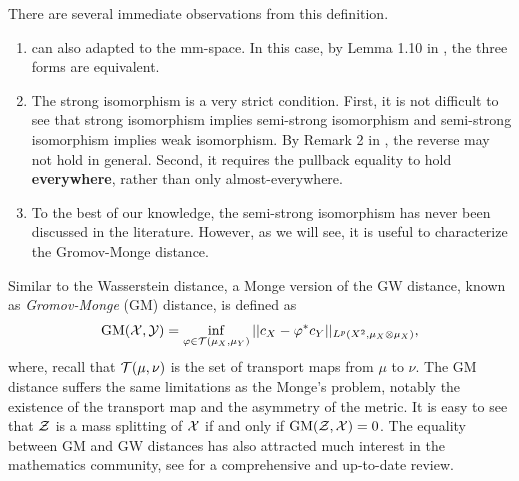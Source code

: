 There are several immediate observations from this definition.
\begin{enumerate}
  \item {} can also adapted to the mm-space. In this case,
  by Lemma 1.10 in \citep{Sturm12}, the three forms are equivalent.

  \item The strong isomorphism is a very strict condition. First,
  it is not difficult to see that strong isomorphism implies semi-strong isomorphism and
  semi-strong isomorphism implies weak isomorphism. By Remark 2 in \citep{Chowdhury19},
  the reverse may not hold in general. Second, it requires the pullback equality to hold
  \textbf{everywhere}, rather than only almost-everywhere.

  \item To the best of our knowledge, the semi-strong isomorphism has never been discussed in the literature.
  However, as we will see, it is useful to characterize the Gromov-Monge distance.
\end{enumerate}
Similar to the Wasserstein distance, a Monge version of the GW distance,
known as \textit{Gromov-Monge} (GM) distance, is defined as
\begin{align}
  \text{GM}(\mathcal X, \mathcal Y) =
  \inf_{\varphi \in \mathcal T(\mu_X, \mu_Y)} || c_X - \varphi^* c_Y ||_{L^p(X^2, \mu_X \otimes \mu_X)},
\end{align}
where, recall that $\mathcal T(\mu, \nu)$ is the set of transport maps from $\mu$ to $\nu$.
The GM distance suffers the same limitations as the Monge's problem,
notably the existence of the transport map and the asymmetry of the metric.
It is easy to see that $\mathcal Z$ is a mass splitting of $\mathcal X$ if and only if $\text{GM}(\mathcal Z, \mathcal X) = 0$.
The equality between GM and GW distances has also attracted much interest
in the mathematics community, see \citep{Memoli22} for a comprehensive and up-to-date review.

